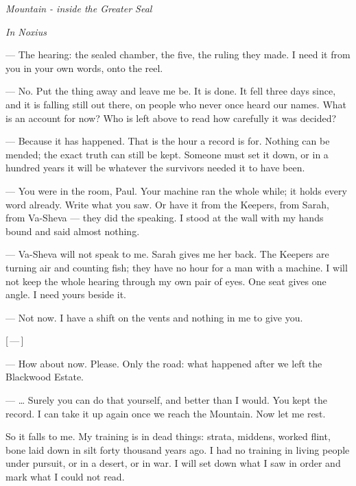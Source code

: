 
\begin{center}\small\itshape Mountain - inside the Greater Seal\end{center}

\begin{room}

\textit{In Noxius}

--- The hearing: the sealed chamber, the five, the ruling they made. I need it from you in your own words, onto the reel.

--- No. Put the thing away and leave me be. It is done. It fell three days since, and it is falling still out there, on people who never once heard our names. What is an account for now? Who is left above to read how carefully it was decided?

--- Because it has happened. That is the hour a record is for. Nothing can be mended; the exact truth can still be kept. Someone must set it down, or in a hundred years it will be whatever the survivors needed it to have been.

--- You were in the room, Paul. Your machine ran the whole while; it holds every word already. Write what you saw. Or have it from the Keepers, from Sarah, from Va-Sheva --- they did the speaking. I stood at the wall with my hands bound and said almost nothing.

--- Va-Sheva will not speak to me. Sarah gives me her back. The Keepers are turning air and counting fish; they have no hour for a man with a machine. I will not keep the whole hearing through my own pair of eyes. One seat gives one angle. I need yours beside it.

--- Not now. I have a shift on the vents and nothing in me to give you.

\centerline{[\,---\,]}

--- How about now. Please. Only the road: what happened after we left the Blackwood Estate.

--- \ldots{} Surely you can do that yourself, and better than I would. You kept the record. I can take it up again once we reach the Mountain. Now let me rest.

\end{room}

So it falls to me. My training is in dead things: strata, middens, worked flint, bone laid down in silt forty thousand years ago. I had no training in living people under pursuit, or in a desert, or in war. I will set down what I saw in order and mark what I could not read.\par

